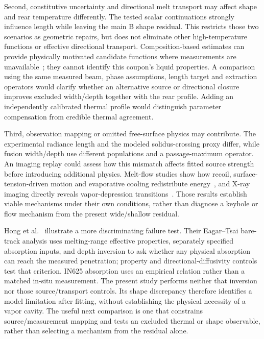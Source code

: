 Second, constitutive uncertainty and directional melt transport may affect shape and rear temperature differently. The tested scalar continuations strongly influence length while leaving the main B shape residual. This restricts those two scenarios as geometric repairs, but does not eliminate other high-temperature functions or effective directional transport. Composition-based estimates can provide physically motivated candidate functions where measurements are unavailable~\cite{mills2006}; they cannot identify this coupon's liquid properties. A comparison using the same measured beam, phase assumptions, length target and extraction operators would clarify whether an alternative source or directional closure improves excluded width/depth together with the rear profile. Adding an independently calibrated thermal profile would distinguish parameter compensation from credible thermal agreement.

Third, observation mapping or omitted free-surface physics may contribute. The experimental radiance length and the modeled solidus-crossing proxy differ, while fusion width/depth use different populations and a passage-maximum operator. An imaging replay could assess how this mismatch affects fitted source strength before introducing additional physics. Melt-flow studies show how recoil, surface-tension-driven motion and evaporative cooling redistribute energy~\cite{khairallah2016}, and X-ray imaging directly reveals vapor-depression transitions~\cite{cunningham2019}. Those results establish viable mechanisms under their own conditions, rather than diagnose a keyhole or flow mechanism from the present wide/shallow residual.

Hong et al.~\cite{hong2026} illustrate a more discriminating failure test. Their Eagar--Tsai bare-track analysis uses melting-range effective properties, separately specified absorption inputs, and depth inversion to ask whether any physical absorption can reach the measured penetration; property and directional-diffusivity controls test that criterion. IN625 absorption uses an empirical relation rather than a matched in-situ measurement. The present study performs neither that inversion nor those source/transport controls. Its shape discrepancy therefore identifies a model limitation after fitting, without establishing the physical necessity of a vapor cavity. The useful next comparison is one that constrains source/measurement mapping and tests an excluded thermal or shape observable, rather than selecting a mechanism from the residual alone.

